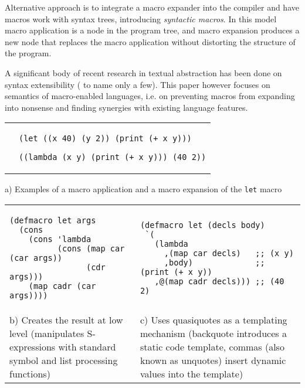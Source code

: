 \documentclass[10pt,journal,a4paper]{IEEEtran}
\begin{document}
Alternative approach is to integrate a macro expander into the compiler and
have macros work with syntax trees, introducing \emph{syntactic macros}.
In this model macro application is a node in the program tree,
and macro expansion produces a new node that replaces the macro application
without distorting the structure of the program.

A significant body of recent research in textual abstraction has been done on syntax
extensibility (\cite{atkinson11, allen09, erdweg11} to name only a few).
This paper however focuses on semantics of macro-enabled languages,
i.e. on preventing macros from expanding into nonsense
and finding synergies with existing language features.

\begin{figure*}[t]
\begin{listing}
\normalsize

\begin{tabular}{p{4.0cm} p{15cm}}\\
 &
\begin{verbatim}
(let ((x 40) (y 2)) (print (+ x y)))

((lambda (x y) (print (+ x y))) (40 2))
\end{verbatim}
\end{tabular}

\begin{center}
a) Examples of a macro application and a macro expansion of the \small \texttt{let} \normalsize macro
\end{center}

\begin{tabular}{p{8.5cm} p{8.5cm}}\\
\begin{verbatim}
(defmacro let args
  (cons
    (cons 'lambda
          (cons (map car (car args))
                (cdr args)))
    (map cadr (car args))))
\end{verbatim}
&
\begin{verbatim}
(defmacro let (decls body)
 `(
   (lambda
     ,(map car decls)   ;; (x y)
     ,body)             ;; (print (+ x y))
   ,@(map cadr decls))) ;; (40 2)
\end{verbatim}\\
b) Creates the result at low level (manipulates S-expressions
with standard symbol and list processing functions)
&
c) Uses quasiquotes \cite{bawden99} as a templating mechanism
(backquote introduces a static code template, commas (also known as
unquotes) insert dynamic values into the template)
\end{tabular}


\end{listing}
\end{figure*}
\end{document}
